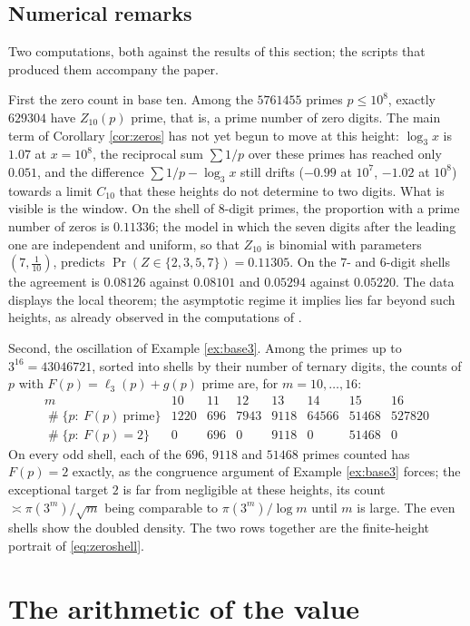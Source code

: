 \documentclass[11pt,reqno]{amsart}
\theoremstyle{plain}
\theoremstyle{definition}
\DeclareMathOperator{\Card}{\#}
\begin{document}
\subsection{Numerical remarks}\label{sec:numerics}
Two computations, both against the results of this section; the scripts that produced them accompany the paper.

First the zero count in base ten. Among the $5761455$ primes $p\le10^{8}$, exactly $629304$ have $Z_{10}(p)$ prime, that is, a prime number of zero digits. The main term of Corollary \ref{cor:zeros} has not yet begun to move at this height: $\log_3x$ is $1.07$ at $x=10^{8}$, the reciprocal sum $\sum 1/p$ over these primes has reached only $0.051$, and the difference $\sum1/p-\log_3x$ still drifts ($-0.99$ at $10^{7}$, $-1.02$ at $10^{8}$) towards a limit $C_{10}$ that these heights do not determine to two digits. What is visible is the window. On the shell of $8$-digit primes, the proportion with a prime number of zeros is $0.11336$; the model in which the seven digits after the leading one are independent and uniform, so that $Z_{10}$ is binomial with parameters $(7,\tfrac1{10})$, predicts $\Pr(Z\in\{2,3,5,7\})=0.11305$. On the $7$- and $6$-digit shells the agreement is $0.08126$ against $0.08101$ and $0.05294$ against $0.05220$. The data displays the local theorem; the asymptotic regime it implies lies far beyond such heights, as already observed in the computations of \cite[Section 6.5]{vibefrtz}.

Second, the oscillation of Example \ref{ex:base3}. Among the primes up to $3^{16}=43046721$, sorted into shells by their number of ternary digits, the counts of $p$ with $F(p)=\ell_3(p)+g(p)$ prime are, for $m=10,\dots,16$:
\[
\begin{array}{c|ccccccc}
m&10&11&12&13&14&15&16\\
\hline
\Card\{p:\ F(p)\ \text{prime}\}&1220&696&7943&9118&64566&51468&527820\\
\Card\{p:\ F(p)=2\}&0&696&0&9118&0&51468&0
\end{array}
\]
On every odd shell, each of the $696$, $9118$ and $51468$ primes counted has $F(p)=2$ exactly, as the congruence argument of Example \ref{ex:base3} forces; the exceptional target $2$ is far from negligible at these heights, its count $\asymp\pi(3^m)/\sqrt m$ being comparable to $\pi(3^m)/\log m$ until $m$ is large. The even shells show the doubled density. The two rows together are the finite-height portrait of \eqref{eq:zeroshell}.

\section{The arithmetic of the value}\label{sec:arithmetic}
\end{document}
